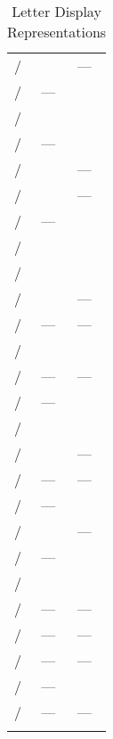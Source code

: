 \begin{longtabu}{ X[1,c,m] X[1,c,m] X[1,c,m] }
  \large{} / \large{} &  & --- \\ 
  \large{} / \large{} & --- &  \\ 
  \large{} / \large{} &  &  \\ 
  \large{} / \large{} & --- &  \\ 
  \large{} / \large{} &  & --- \\ 
  \large{} / \large{} &  & --- \\ 
  \large{} / \large{} & --- &  \\ 
  \large{} / \large{} &  &  \\ 
  \large{} / \large{} &  &  \\ 
  \large{} / \large{} &  & --- \\ 
  \large{} / \large{} & --- & --- \\ 
  \large{} / \large{} &  &  \\ 
  \large{} / \large{} & --- & --- \\ 
  \large{} / \large{} & --- &  \\ 
  \large{} / \large{} &  &  \\ 
  \large{} / \large{} &  & --- \\ 
  \large{} / \large{} & --- & --- \\ 
  \large{} / \large{} & --- &  \\ 
  \large{} / \large{} &  & --- \\ 
  \large{} / \large{} & --- &  \\ 
  \large{} / \large{} &  &  \\ 
  \large{} / \large{} & --- & --- \\ 
  \large{} / \large{} & --- & --- \\ 
  \large{} / \large{} & --- & --- \\ 
  \large{} / \large{} & --- &  \\ 
  \large{} / \large{} & --- & --- \\

  \bhrule
  \caption{Letter Display Representations}
\end{longtabu}

